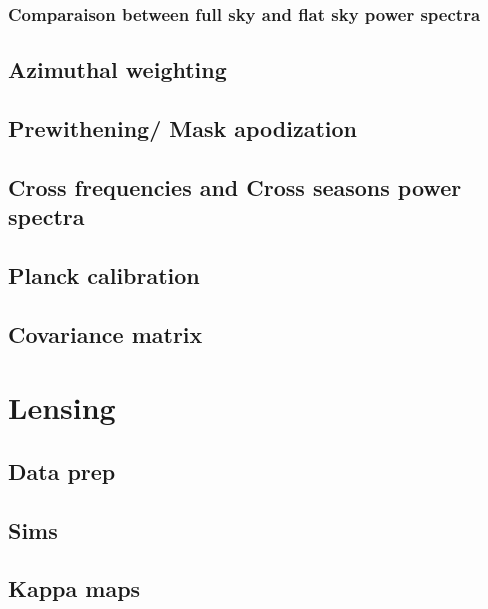 \documentclass[a4paper, 11pt]{article}
\def\ba{\begin{eqnarray}}
\def\ea{\end{eqnarray}}
\begin{document}
\subsubsection{Comparaison between full sky and flat sky power spectra}


\subsection{Azimuthal weighting}

\subsection{Prewithening/ Mask apodization}

\subsection{Cross frequencies and Cross seasons  power spectra}

\subsection{Planck calibration}

\subsection{Covariance matrix}


 
\section{Lensing}

\subsection{Data prep}
\subsection{Sims}
\subsection{Kappa maps}
\end{document}
